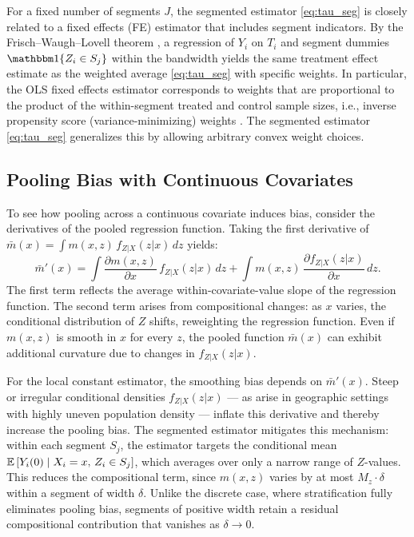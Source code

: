\begin{remark}\label{rem:fe}
	For a fixed number of segments $J$, the segmented estimator \eqref{eq:tau_seg} is closely related to a fixed effects (FE) estimator that includes segment indicators.
	By the Frisch--Waugh--Lovell theorem \parencite[see also][for the extension to standard errors]{ding_frischwaughlovell_2021}, a regression of $Y_i$ on $T_i$ and segment dummies $\ind\{Z_i \in S_j\}$ within the bandwidth yields the same treatment effect estimate as the weighted average \eqref{eq:tau_seg} with specific weights.
	In particular, the OLS fixed effects estimator corresponds to weights that are proportional to the product of the within-segment treated and control sample sizes, i.e., inverse propensity score (variance-minimizing) weights \parencite{negi_revisiting_2021}.
	The segmented estimator \eqref{eq:tau_seg} generalizes this by allowing arbitrary convex weight choices.
\end{remark}


\subsection{Pooling Bias with Continuous Covariates}\label{sec:setup:pooling_bias}

To see how pooling across a continuous covariate induces bias, consider the derivatives of the pooled regression function.
Taking the first derivative of $\bar{m}(x) = \int m(x,z)\, f_{Z|X}(z|x)\, dz$ yields:
\begin{equation}\label{eq:mbar_deriv}
	\bar{m}'(x) = \int \frac{\partial m(x,z)}{\partial x}\, f_{Z|X}(z|x)\, dz + \int m(x,z)\, \frac{\partial f_{Z|X}(z|x)}{\partial x}\, dz.
\end{equation}
The first term reflects the average within-covariate-value slope of the regression function.
The second term arises from compositional changes: as $x$ varies, the conditional distribution of $Z$ shifts, reweighting the regression function.
Even if $m(x,z)$ is smooth in $x$ for every $z$, the pooled function $\bar{m}(x)$ can exhibit additional curvature due to changes in $f_{Z|X}(z|x)$.

For the local constant estimator, the smoothing bias depends on $\bar{m}'(x)$.
Steep or irregular conditional densities $f_{Z|X}(z|x)$ --- as arise in geographic settings with highly uneven population density --- inflate this derivative and thereby increase the pooling bias.
The segmented estimator mitigates this mechanism: within each segment $S_j$, the estimator targets the conditional mean $\operatorname{\mathbb{E}}\left[Y_i(0) \mid X_i = x,\, Z_i \in S_j\right]$, which averages over only a narrow range of $Z$-values.
This reduces the compositional term, since $m(x,z)$ varies by at most $M_z \cdot \delta$ within a segment of width $\delta$.
Unlike the discrete case, where stratification fully eliminates pooling bias, segments of positive width retain a residual compositional contribution that vanishes as $\delta \to 0$.
